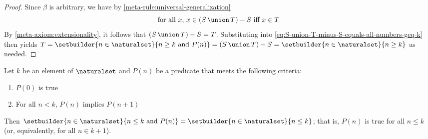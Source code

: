 \begin{proof}
    Since \( \beta \) is arbitrary, we have by \cref{meta-rule:universal-generalization}
    \begin{equation*}
        \text{for all \( x \), \( x \in \mleft( S \,{\union}\, T \mright) - S \) iff \( x \in T \)}
    \end{equation*}
    By \cref{meta-axiom:extensionality}, it follows that \( \mleft( S \,{\union}\, T \mright) - S = T \).
    Substituting into \eqref{eq:S-union-T-minus-S-equals-all-numbers-geq-k} then yields
    \( T = \setbuilder{n \in \naturalset}{n \geq k \ \text{and} \ P(n)} = \mleft( S \,{\union}\, T \mright) - S = \setbuilder{n \in \naturalset}{n \geq k} \)
    as needed.
\end{proof}

\begin{thm}
     \label{thm:metatheory-finite-induction}
    Let \( k \) be an element of \( \naturalset \) and \( P(n) \)
    be a predicate that meets the following criteria:
    \begin{enumerate}[topsep=2pt,label=\textup{\texttt{(\alph*)}}]
        \item \( P(0) \) is true
        \item For all \( n < k \), \( P(n) \) implies \( P(n + 1) \)
    \end{enumerate}
    Then \( \setbuilder{n \in \naturalset}{n \leq k \ \text{and} \ P(n)} = \setbuilder{n \in \naturalset}{n \leq k} \);
    that is, \( P(n) \) is true for all \( n \leq k \) (or, equivalently, for all \( n \in k + 1 \)).
\end{thm}

